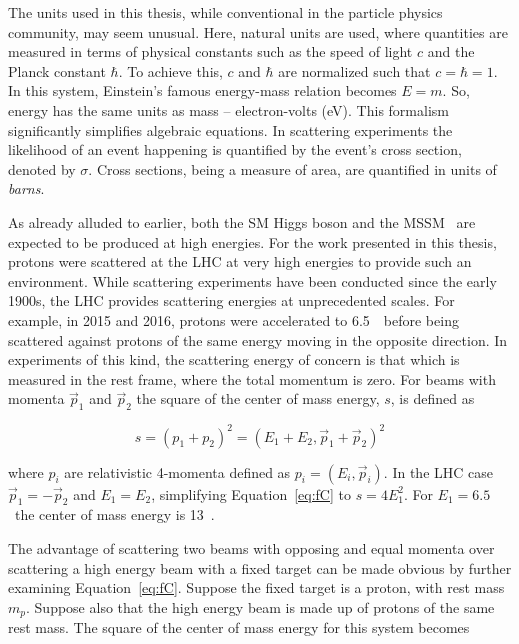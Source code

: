 \par The units used in this thesis, while conventional in the particle physics community, may seem 
unusual. Here, natural units are used, where quantities are measured in terms of physical constants 
such as the speed of light $c$ and the Planck constant $\hbar$. To achieve this, $c$ and $\hbar$ are 
normalized such that $c=\hbar=1$. In this system, Einstein's famous energy-mass relation becomes 
$E = m$. So, energy has the same units as mass -- electron-volts (eV). This formalism significantly 
simplifies algebraic equations. In scattering experiments the likelihood of an event happening is quantified by the event's 
cross section, denoted by $\sigma$. Cross sections, being a measure of area, are quantified in units 
of {\it barns}.   

\par As already alluded to earlier, both the SM Higgs boson and the MSSM \Hpm\ are expected to 
be produced at high energies. For the work presented in this thesis, protons were scattered at the LHC at very high energies to 
provide such an environment. While scattering experiments have been conducted since the early 1900s, 
the LHC provides scattering energies at unprecedented scales. For example, in 2015 and 2016, protons were accelerated to 
6.5~\TeV\ before being scattered against protons of the same energy moving in the opposite direction. 
In experiments of this kind, the scattering energy of concern is that which is measured in the rest frame, 
where the total momentum is zero. For beams with momenta $\vec{p}_1$ and $\vec{p}_2$ 
the square of the center of mass energy, $s$, is defined as

\begin{equation}
s = (p_1 + p_2)^2 = (E_1+E_2, \vec{p}_1 + \vec{p}_2)^2
\label{eq:fC}
\end{equation}  

where $p_i$ are relativistic 4-momenta defined as $p_i = (E_i,\vec{p}_i)$.  
In the LHC case $\vec{p}_1=-\vec{p}_2$ and $E_1=E_2$, simplifying Equation~\ref{eq:fC} to 
$s = 4E_1^2$. For $E_1= 6.5$~\TeV the center of mass energy is 13~\TeV. 

\par The advantage of scattering two beams with opposing and equal momenta over scattering 
a high energy beam with a fixed target can be made obvious by further examining Equation~\ref{eq:fC}.
Suppose the fixed target is a proton, with rest mass $m_p$. Suppose also that the high energy beam 
is made up of protons of the same rest mass. The square of the center of mass energy 
for this system becomes 

